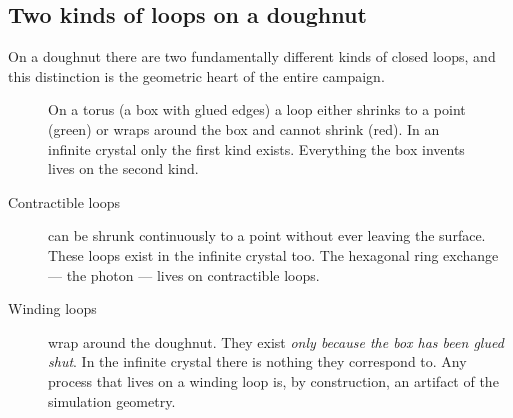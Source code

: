 \documentclass[11pt,a4paper]{article}
\begin{document}
\subsection{Two kinds of loops on a doughnut}

On a doughnut there are two fundamentally different kinds of closed loops,
and this distinction is the geometric heart of the entire campaign.

\begin{figure}[h]
\centering
{}
\caption{On a torus (a box with glued edges) a loop either shrinks to a point
(green) or wraps around the box and cannot shrink (red).  In an infinite
crystal only the first kind exists.  Everything the box invents lives on the
second kind.}
\label{fig:torus}
\end{figure}

\begin{description}
\item[Contractible loops] can be shrunk continuously to a point without ever
leaving the surface.  These loops exist in the infinite crystal too.  The
hexagonal ring exchange --- the photon --- lives on contractible loops.

\item[Winding loops] wrap around the doughnut.  They exist \emph{only
because the box has been glued shut}.  In the infinite crystal there is
nothing they correspond to.  Any process that lives on a winding loop is,
by construction, an artifact of the simulation geometry.
\end{description}
\end{document}

